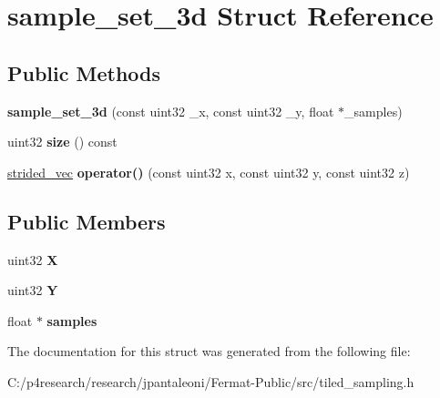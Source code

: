 \hypertarget{structsample__set__3d}{}\section{sample\+\_\+set\+\_\+3d Struct Reference}
\label{structsample__set__3d}
\subsection*{Public Methods}
\begin{DoxyCompactItemize}
\item 
\mbox{\label{structsample__set__3d_a958925ffcbca9a2da586cb23fcd5bd03}} 
{\bfseries sample\+\_\+set\+\_\+3d} (const uint32 \+\_\+x, const uint32 \+\_\+y, float $\ast$\+\_\+samples)
\item 
\mbox{\label{structsample__set__3d_a30fa2ee34661e99bfe991ba161db7673}} 
uint32 {\bfseries size} () const
\item 
\mbox{\label{structsample__set__3d_ac77cec338f1a03e86424f089ef29b8c0}} 
\hyperlink{structstrided__vec}{strided\+\_\+vec} {\bfseries operator()} (const uint32 x, const uint32 y, const uint32 z)
\end{DoxyCompactItemize}
\subsection*{Public Members}
\begin{DoxyCompactItemize}
\item 
\mbox{\label{structsample__set__3d_a2ff8d35b464368bd74b7b5d5f8291562}} 
uint32 {\bfseries X}
\item 
\mbox{\label{structsample__set__3d_a500018602707accf12a763b05876b93c}} 
uint32 {\bfseries Y}
\item 
\mbox{\label{structsample__set__3d_af9f9c819791a3017da75a2c276b8f305}} 
float $\ast$ {\bfseries samples}
\end{DoxyCompactItemize}


The documentation for this struct was generated from the following file\+:\begin{DoxyCompactItemize}
\item 
C\+:/p4research/research/jpantaleoni/\+Fermat-\/\+Public/src/tiled\+\_\+sampling.\+h\end{DoxyCompactItemize}
